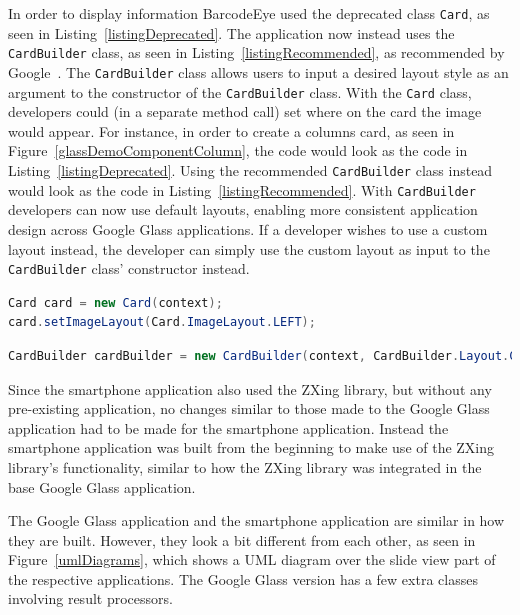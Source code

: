In order to display information BarcodeEye used the deprecated class \texttt{Card}, as seen in Listing~\ref{listingDeprecated}. The application now instead uses the \texttt{CardBuilder} class, as seen in Listing~\ref{listingRecommended}, as recommended by Google~\cite{googleCard}. The \texttt{CardBuilder} class allows users to input a desired layout style as an argument to the constructor of the \texttt{CardBuilder} class. With the \texttt{Card} class, developers could (in a separate method call) set where on the card the image would appear. For instance, in order to create a columns card, as seen in Figure~\ref{glassDemoComponentColumn}, the code would look as the code in Listing~\ref{listingDeprecated}. Using the recommended \texttt{CardBuilder} class instead would look as the code in Listing~\ref{listingRecommended}. With \texttt{CardBuilder} developers can now use default layouts, enabling more consistent application design across Google Glass applications. If a developer wishes to use a custom layout instead, the developer can simply use the custom layout as input to the \texttt{CardBuilder} class' constructor instead.

\begin{lstlisting}[language=Java, caption={Instancing of the deprecated class Card}, label=listingDeprecated]
Card card = new Card(context);
card.setImageLayout(Card.ImageLayout.LEFT);
\end{lstlisting}

\begin{lstlisting}[language=Java, caption={Instancing of the recommended class CardBuilder}, label=listingRecommended]
CardBuilder cardBuilder = new CardBuilder(context, CardBuilder.Layout.COLUMNS);
\end{lstlisting}

Since the smartphone application also used the ZXing library, but without any pre-existing application, no changes similar to those made to the Google Glass application had to be made for the smartphone application. Instead the smartphone application was built from the beginning to make use of the ZXing library's functionality, similar to how the ZXing library was integrated in the base Google Glass application.

The Google Glass application and the smartphone application are similar in how they are built. However, they look a bit different from each other, as seen in Figure~\ref{umlDiagrams}, which shows a UML diagram over the slide view part of the respective applications. The Google Glass version has a few extra classes involving result processors.

